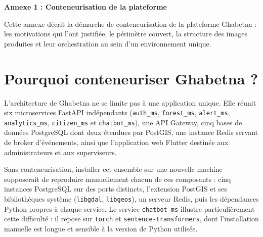%

\newpage
{}
{}

\begin{center}
  {\fontsize{30}{35}\selectfont \textbf{Annexe 1 : Conteneurisation de la plateforme}}
\end{center}
\vspace{1cm}

Cette annexe décrit la démarche de conteneurisation de la plateforme Ghabetna :
les motivations qui l'ont justifiée, le périmètre couvert, la structure des
images produites et leur orchestration au sein d'un environnement unique.

\section*{Pourquoi conteneuriser Ghabetna ?}

L'architecture de Ghabetna ne se limite pas à une application unique. Elle
réunit six microservices FastAPI indépendants (\texttt{auth\_ms},
\texttt{forest\_ms}, \texttt{alert\_ms}, \texttt{analytics\_ms},
\texttt{citizen\_ms} et \texttt{chatbot\_ms}), une API Gateway, cinq bases de
données PostgreSQL dont deux étendues par PostGIS, une instance Redis servant
de broker d'événements, ainsi que l'application web Flutter destinée aux
administrateurs et aux superviseurs.

Sans conteneurisation, installer cet ensemble sur une nouvelle machine
supposerait de reproduire manuellement chacun de ces composants : cinq
instances PostgreSQL sur des ports distincts, l'extension PostGIS et ses
bibliothèques système (\texttt{libgdal}, \texttt{libgeos}), un serveur Redis,
puis les dépendances Python propres à chaque service. Le service
\texttt{chatbot\_ms} illustre particulièrement cette difficulté : il repose
sur \texttt{torch} et \texttt{sentence-transformers}, dont l'installation
manuelle est longue et sensible à la version de Python utilisée.

